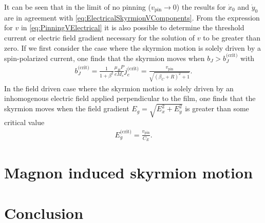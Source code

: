 \documentclass[12pt, a4paper, twoside, openright]{report}
\numberwithin{equation}{chapter}
\numberwithin{figure}{chapter}
\numberwithin{table}{chapter}
\begin{document}
It can be seen that in the limit of no pinning ($v_{\textrm{pin}} \rightarrow 0$) the results for $\dot{x}_0$ and $\dot{y}_0$ are in agreement with \eqref{eq:ElectricalSkyrmionVComponents}. From the expression for $v$ in \eqref{eq:PinningVElectrical} it is also possible to determine the threshold current or electric field gradient necessary for the solution of $v$ to be greater than zero. If we first consider the case where the skyrmion motion is solely driven by a spin-polarized current, one finds that the skyrmion moves when $b_J > b_J^{\textrm{(crit)}}$ with
\begin{align}
b_J^{\textrm{(crit)}} = \frac{1}{1+\beta^2} \frac{\mu_BP}{eM_s}j_e^{\textrm{(crit)}}= \frac{v_{\textrm{pin}}}{\sqrt{(\beta_C+R)^2+1}}.
\end{align}
In the field driven case where the skyrmion motion is solely driven by an inhomogenous electric field applied perpendicular to the film, one finds that the skyrmion moves when the field gradient $E_g = \sqrt{E_x^2+E_y^2}$ is greater than some critical value
\begin{align}
E_g^{\textrm{(crit)}} = \frac{v_{\textrm{pin}}}{C_E}.
\end{align}

\chapter{Magnon induced skyrmion motion}

\chapter{Conclusion}



\end{document}
